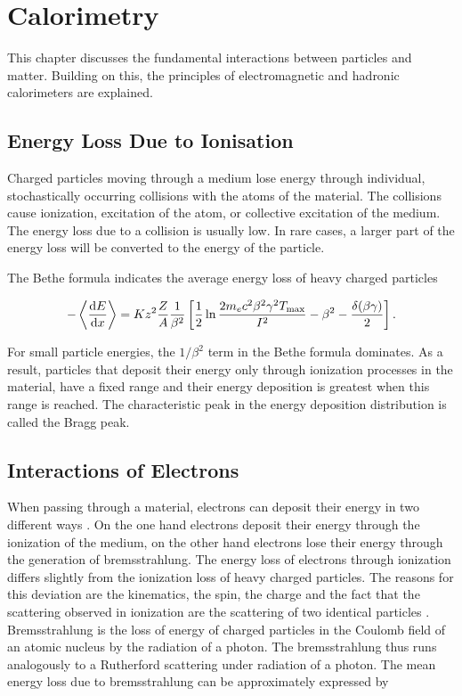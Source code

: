 \documentclass[12pt, a4paper]{thesis}
\begin{document}
\chapter{Calorimetry}
\label{sec:org802b29d}

This chapter discusses the fundamental interactions between particles and
matter.  Building on this, the principles of
electromagnetic and hadronic calorimeters are explained.

\section{Energy Loss Due to Ionisation}
\label{sec:org57bbfcf}

Charged particles moving through a medium lose energy through
individual, stochastically occurring collisions with the atoms of the
material. The collisions cause ionization, excitation of the atom, or
collective excitation of the medium.  The energy loss due to a
collision is usually low. In rare cases, a larger part of the energy
loss will be converted to the energy of the particle.

The Bethe formula indicates the average energy loss of heavy charged particles

\begin{align}
-\expval{\dv{E}{x}} = K z^2 \frac{Z}{A} \frac{1}{\beta^{2}} \left[ \frac{1}{2} \ln{\frac{2 m_{e} c^{2} \beta^{2} \gamma^{2} T_{\text{max}}}{I^{2}}}-\beta^{2} - \frac{\delta(\beta\gamma)}{2}\right].
\end{align}

For small particle energies, the \(1/\beta^2\) term in the Bethe formula
dominates. As a result, particles that deposit their energy only
through ionization processes in the material, have a fixed range and
their energy deposition is greatest when this range is reached. The
characteristic peak in the energy deposition distribution is called
the Bragg peak.

\section{Interactions of Electrons}
\label{sec:org978e80c}

When passing through a material, electrons can deposit their energy in
two different ways \cite{kolanoski16}. On the one hand electrons
deposit their energy through the ionization of the medium, on the
other hand electrons lose their energy through the generation of
bremsstrahlung.  The energy loss of electrons through ionization
differs slightly from the ionization loss of heavy charged
particles. The reasons for this deviation are the kinematics, the
spin, the charge and the fact that the scattering observed in
ionization are the scattering of two identical particles
\cite{PhysRevD.98.030001}.  Bremsstrahlung is the loss of energy of
charged particles in the Coulomb field of an atomic nucleus by the
radiation of a photon. The bremsstrahlung thus runs analogously to a
Rutherford scattering under radiation of a photon.  The mean energy
loss due to bremsstrahlung can be approximately expressed by
\end{document}
